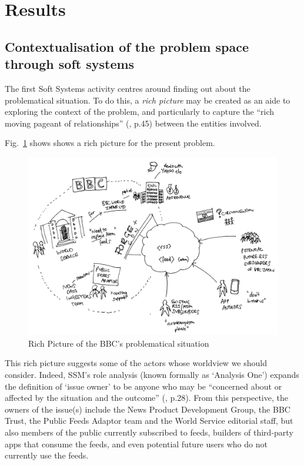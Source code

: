 \documentclass[runningheads,a4paper]{llncs}
\begin{document}
\section{Results}

\subsection{Contextualisation of the problem space through soft systems}

The first Soft Systems activity centres around finding out about the problematical situation. To do this, a \textit{rich picture} may be created as an aide to exploring the context of the problem, and particularly to capture the ``rich moving pageant of relationships'' (\cite{checkland1990}, p.45) between the entities involved.

Fig.~\ref{fig:richpicture} shows shows a rich picture for the present problem. 

\begin{figure}
\centering
\includegraphics[width=\textwidth]{richpicture}
\caption{Rich Picture of the BBC's problematical situation}
\label{fig:richpicture}
\end{figure}

This rich picture suggests some of the actors whose worldview we should consider. Indeed, SSM's role analysis (known formally as `Analysis One') expands the definition of `issue owner' to be anyone who may be ``concerned about or affected by the situation and the outcome'' (\cite{checkland2006}, p.28). From this perspective, the owners of the issue(s) include the News Product Development Group, the BBC Trust, the Public Feeds Adaptor team and the World Service editorial staff, but also members of the public currently subscribed to feeds, builders of third-party apps that consume the feeds, and even potential future users who do not currently use the feeds.
\end{document}
